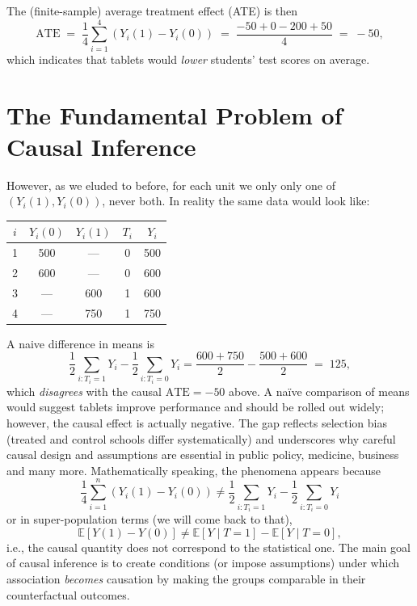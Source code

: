 \documentclass[11pt]{exam}
\theoremstyle{plain}
\newcommand{\E}{\mathbb{E}}
\begin{document}
\noindent The (finite-sample) average treatment effect (ATE) is then
\[
\mathrm{ATE} \;=\; \frac{1}{4}\sum_{i=1}^4 (Y_i(1) - Y_i(0)) \;=\; \frac{-50 + 0 - 200 + 50}{4} \;=\; -50,
\]
which indicates that tablets would \emph{lower} students' test scores on average.

\newpage

\section{The Fundamental Problem of Causal Inference}

However, as we eluded to before, for each unit we only only one of $(Y_i(1),Y_i(0))$, never both. In reality the same data would look like:

\begin{center}
\begin{tabular}{@{}ccccc@{}}
\toprule
$i$ & $Y_i(0)$ & $Y_i(1)$ & $T_i$ & $Y_i$\\
\midrule
1 & 500 & --- & 0 & 500\\
2 & 600 & --- & 0 & 600\\
3 & --- & 600 & 1 & 600\\
4 & --- & 750 & 1 & 750\\
\bottomrule
\end{tabular}
\end{center}

\noindent A naive difference in means is
\[
\frac{1}{2}\sum_{i:T_i = 1} Y_i - \frac{1}{2}\sum_{i:T_i = 0} Y_i
= \frac{600+750}{2} - \frac{500+600}{2} \;=\; 125,
\]
which \emph{disagrees} with the causal $\mathrm{ATE}=-50$ above. A naïve comparison of means would suggest tablets improve performance and should be rolled out widely; however, the causal effect is actually negative. The gap reflects selection bias (treated and control schools differ systematically) and underscores why careful causal design and assumptions are essential in public policy, medicine, business and many more.
Mathematically speaking, the phenomena appears because
\[
\frac{1}{4}\sum_{i=1}^n (Y_i(1) - Y_i(0))\neq \frac{1}{2}\sum_{i:T_i = 1} Y_i - \frac{1}{2}\sum_{i:T_i = 0} Y_i
\]
or in super-population terms (we will come back to that),
\[
\E[Y(1)-Y(0)] \neq \E[Y\mid T=1]-\E[Y\mid T=0],
\]
i.e., the causal quantity does not correspond to the statistical one. The main goal of causal inference is to create conditions (or impose assumptions) under which association \emph{becomes} causation by making the groups comparable in their counterfactual outcomes.
\end{document}
